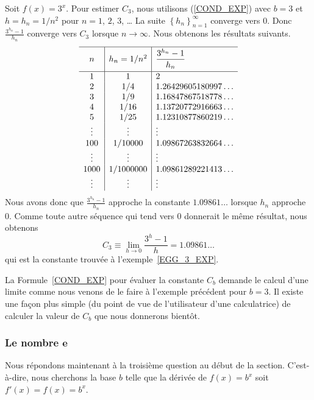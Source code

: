 {\begin{egg}
Soit $f(x) = 3^x$.  Pour estimer $C_3$, nous utilisons (\ref{COND_EXP})
avec $b = 3$ et $h = h_n = 1/n^2$ pour $n=1$, $2$, $3$, \ldots
La suite $\displaystyle \left\{h_n\right\}_{n=1}^\infty$ converge vers
$0$.  Donc $\displaystyle \frac{3^{h_n}-1}{h_n}$ converge vers $C_3$
lorsque $n \to \infty$.  Nous obtenons les résultats suivants.
\[
\begin{array}{c|c|l}
\hline
\rule[-0.4em]{0ex}{1.5em} n & h_n = 1/n^2 &
\rule{0em}{1.7em} \displaystyle \frac{3^{h_n}-1}{h_n} \\[0.8em]
\hline
1 & 1 & 2 \\
2 & 1/4 & 1.26429605180997\ldots \\
3 & 1/9 & 1.16847867518778\ldots \\
4 & 1/16 & 1.13720772916663\ldots \\
5 & 1/25 & 1.12310877860219\ldots \\
\vdots & \vdots & \vdots \\
100 & 1/10000 & 1.09867263832664\ldots \\
\vdots & \vdots & \vdots \\
1000 & 1/1000000 & 1.09861289221413\ldots \\
\vdots & \vdots & \vdots \\
\end{array}
\]
Nous avons donc que $\displaystyle \frac{3^{h_n}-1}{h_n}$ approche la constante
$1.09861\ldots$ lorsque $h_n$ approche $0$.  Comme toute autre
séquence qui tend vers $0$ donnerait le même résultat, nous obtenons
\[
C_3 \equiv \lim_{h\rightarrow 0} \frac{3^h-1}{h} = 1.09861\ldots
\]
qui est la constante trouvée à l'exemple~\ref{EGG_3_EXP}.
\label{COND_EXP_EGG}
\end{egg}

La Formule~\ref{COND_EXP} pour évaluer la constante $C_b$ demande le
calcul d'une limite comme nous venons de le faire à l'exemple précédent
pour $b=3$.  Il existe une façon plus simple (du point de vue de
l'utilisateur d'une calculatrice) de calculer la valeur de $C_b$ que
nous donnerons bientôt.

\subsubsection{Le nombre $\mathbf e$}

Nous répondons maintenant à la troisième question au début de la section.
C'est-à-dire, nous cherchons la base $b$ telle que la dérivée de
$f(x) = b^x$ soit $f'(x) = f(x) = b^x$.

}
